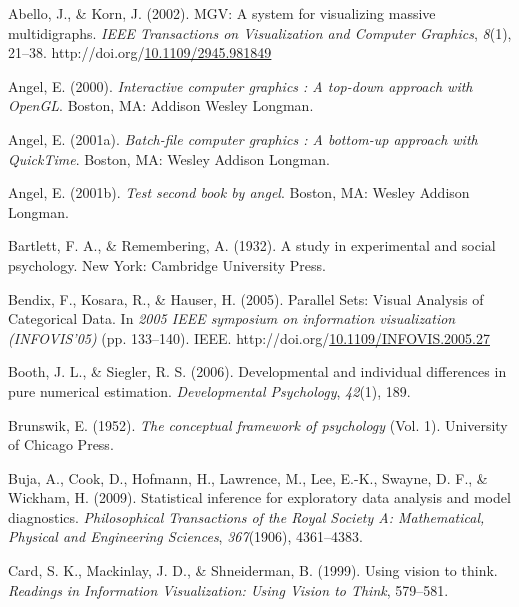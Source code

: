 \documentclass[print]{nuthesis}
\newlength{\cslhangindent}
\newenvironment{CSLReferences}[2]%
{\setlength{\parindent}{0pt}%
\everypar{\setlength{\hangindent}{\cslhangindent}}\ignorespaces}%
{\par}
\begin{document}
\hypertarget{refs}{}
\begin{CSLReferences}{1}{0}
\leavevmode\hypertarget{ref-abello2002}{}%
Abello, J., \& Korn, J. (2002). MGV: A system for visualizing massive multidigraphs. \emph{IEEE Transactions on Visualization and Computer Graphics}, \emph{8}(1), 21--38. http://doi.org/\href{https://doi.org/10.1109/2945.981849}{10.1109/2945.981849}

\leavevmode\hypertarget{ref-angel2000}{}%
Angel, E. (2000). \emph{Interactive computer graphics : A top-down approach with OpenGL}. Boston, MA: Addison Wesley Longman.

\leavevmode\hypertarget{ref-angel2001}{}%
Angel, E. (2001a). \emph{Batch-file computer graphics : A bottom-up approach with QuickTime}. Boston, MA: Wesley Addison Longman.

\leavevmode\hypertarget{ref-angel2002a}{}%
Angel, E. (2001b). \emph{Test second book by angel}. Boston, MA: Wesley Addison Longman.

\leavevmode\hypertarget{ref-bartlett1932}{}%
Bartlett, F. A., \& Remembering, A. (1932). A study in experimental and social psychology. New York: Cambridge University Press.

\leavevmode\hypertarget{ref-Bendix:2005}{}%
Bendix, F., Kosara, R., \& Hauser, H. (2005). {Parallel Sets: Visual Analysis of Categorical Data}. In \emph{2005 IEEE symposium on information visualization (INFOVIS'05)} (pp. 133--140). IEEE. http://doi.org/\href{https://doi.org/10.1109/INFOVIS.2005.27}{10.1109/INFOVIS.2005.27}

\leavevmode\hypertarget{ref-booth2006}{}%
Booth, J. L., \& Siegler, R. S. (2006). Developmental and individual differences in pure numerical estimation. \emph{Developmental Psychology}, \emph{42}(1), 189.

\leavevmode\hypertarget{ref-brunswik1952}{}%
Brunswik, E. (1952). \emph{The conceptual framework of psychology} (Vol. 1). University of Chicago Press.

\leavevmode\hypertarget{ref-buja2009}{}%
Buja, A., Cook, D., Hofmann, H., Lawrence, M., Lee, E.-K., Swayne, D. F., \& Wickham, H. (2009). Statistical inference for exploratory data analysis and model diagnostics. \emph{Philosophical Transactions of the Royal Society A: Mathematical, Physical and Engineering Sciences}, \emph{367}(1906), 4361--4383.

\leavevmode\hypertarget{ref-card1999}{}%
Card, S. K., Mackinlay, J. D., \& Shneiderman, B. (1999). Using vision to think. \emph{Readings in Information Visualization: Using Vision to Think}, 579--581.


\end{CSLReferences}
\end{document}
